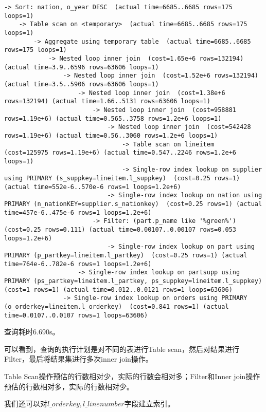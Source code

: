 \documentclass{article}
\begin{document}
\begin{lstlisting}
-> Sort: nation, o_year DESC  (actual time=6685..6685 rows=175 loops=1)
    -> Table scan on <temporary>  (actual time=6685..6685 rows=175 loops=1)
        -> Aggregate using temporary table  (actual time=6685..6685 rows=175 loops=1)
            -> Nested loop inner join  (cost=1.65e+6 rows=132194) (actual time=3.9..6596 rows=63606 loops=1)
                -> Nested loop inner join  (cost=1.52e+6 rows=132194) (actual time=3.5..5906 rows=63606 loops=1)
                    -> Nested loop inner join  (cost=1.38e+6 rows=132194) (actual time=1.66..5131 rows=63606 loops=1)
                        -> Nested loop inner join  (cost=958881 rows=1.19e+6) (actual time=0.565..3758 rows=1.2e+6 loops=1)
                            -> Nested loop inner join  (cost=542428 rows=1.19e+6) (actual time=0.56..3060 rows=1.2e+6 loops=1)
                                -> Table scan on lineitem  (cost=125975 rows=1.19e+6) (actual time=0.547..2246 rows=1.2e+6 loops=1)
                                -> Single-row index lookup on supplier using PRIMARY (s_suppkey=lineitem.l_suppkey)  (cost=0.25 rows=1) (actual time=552e-6..570e-6 rows=1 loops=1.2e+6)
                            -> Single-row index lookup on nation using PRIMARY (n_nationKEY=supplier.s_nationkey)  (cost=0.25 rows=1) (actual time=457e-6..475e-6 rows=1 loops=1.2e+6)
                        -> Filter: (part.p_name like '%green%')  (cost=0.25 rows=0.111) (actual time=0.00107..0.00107 rows=0.053 loops=1.2e+6)
                            -> Single-row index lookup on part using PRIMARY (p_partkey=lineitem.l_partkey)  (cost=0.25 rows=1) (actual time=764e-6..782e-6 rows=1 loops=1.2e+6)
                    -> Single-row index lookup on partsupp using PRIMARY (ps_partkey=lineitem.l_partkey, ps_suppkey=lineitem.l_suppkey)  (cost=1 rows=1) (actual time=0.012..0.0121 rows=1 loops=63606)
                -> Single-row index lookup on orders using PRIMARY (o_orderkey=lineitem.l_orderkey)  (cost=0.841 rows=1) (actual time=0.0107..0.0107 rows=1 loops=63606)
\end{lstlisting}

查询耗时6.690s。

可以看到，查询的执行计划是对不同的表进行Table scan，然后对结果进行Filter，最后将结果集进行多次inner join操作。

Table Scan操作预估的行数相对少，实际的行数会相对多；Filter和Inner join操作预估的行数相对多，实际的行数相对少。

我们还可以对$l\_orderkey,l\_linenumber$字段建立索引。
\end{document}
